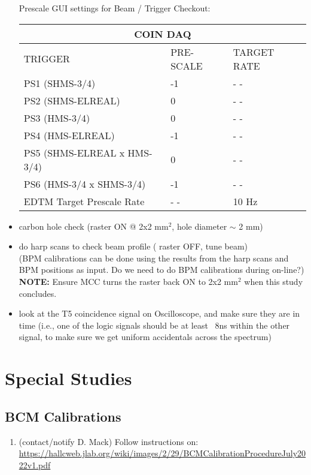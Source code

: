 \documentclass{article}
\begin{document}
\begin{itemize}
Prescale GUI settings for Beam / Trigger Checkout:
    \begin{center}
    \begin{tabular}{ |p{6cm}| |p{3cm}| |p{3cm}| }
    \hline
    \multicolumn{3}{|c|}{COIN DAQ} \\
    \hline
    TRIGGER & PRE-SCALE & TARGET RATE\\
    \hline
    PS1 (SHMS-3/4)    & -1  & - - \\
    PS2 (SHMS-ELREAL) &  0  & - - \\
    PS3 (HMS-3/4)     & 0  & - -\\
    PS4 (HMS-ELREAL)  & -1  & - - \\
    PS5 (SHMS-ELREAL x HMS-3/4)  & 0 & - -  \\
    PS6 (HMS-3/4 x SHMS-3/4)     & -1 & - -  \\
    \hline
    EDTM Target Prescale Rate & - - & 10 Hz \\
    \hline
    \end{tabular}
    \end{center}
 \item carbon hole check (raster ON @ 2x2 mm$^{2}$, hole diameter $\sim$ 2 mm)
 \item do harp scans to check beam profile ( raster OFF, tune beam) \\(BPM calibrations can
 be done using the results from the harp scans and BPM positions as input. Do we need to
 do BPM calibrations during on-line?) \\ \textbf{NOTE:} Ensure MCC turns the raster back ON to 2x2 mm$^{2}$ when this study concludes.
 \item look at the T5 coincidence signal on Oscilloscope, and make sure they are in
time (i.e., one of the logic signals should be at least ~8ns within the other signal, to make
sure we get uniform accidentals across the spectrum)
\end{itemize}

\section{Special Studies}
\subsection{BCM Calibrations}
\begin{enumerate}
    \item (contact/notify D. Mack) Follow instructions on: \\ \url{https://hallcweb.jlab.org/wiki/images/2/29/BCMCalibrationProcedureJuly2022v1.pdf}
    
\end{enumerate}
\end{document}
